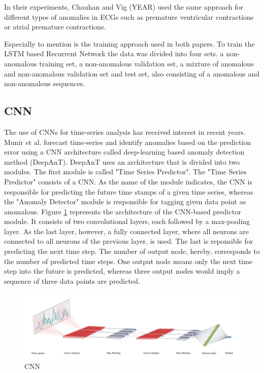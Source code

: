 In their experiments, Chauhan and Vig (YEAR) used the same approach for different types of anomalies in ECGs such as premature ventricular contractions or atrial premature contractions. 

Especially to mention is the training approach used in both papers. To train the  LSTM based Recurrent Network the data was divided into four sets. a non-anomalous training set, a non-anomalous validation set, a mixture of anomalous and non-anomalous validation set and test set, also consisting of a anomalous and non-anomalous sequences. 



\subsection{CNN}

The use of CNNs for time-series analysis has received interest in recent years. Munir et al. forecast time-series and identify anomalies based on the prediction error using a CNN architecture called deep-learning based anomaly detection method (DeepAnT). DeepAnT uses an architecture that is divided into two modules. The first module is called "Time Series Predictor". The "Time Series Predictor" consists of a CNN. As the name of the module indicates, the CNN is responsible for predicting the future time stamps of a given time series, whereas  the "Anomaly Detector" module is responsible for tagging given data point as anomalous. Figure \ref{fig:CNN} represents the architecture of the CNN-based predictor module. It consists of two convolutional layers, each followed by a max-pooling layer. As the last layer, however, a fully connected layer, where all neurons are connected to all neurons of the previous layer, is used. The last is reponsible for predicting the next time step. The number of output node, hereby, corresponds to the number of predicted time steps. One output node means only the next time step into the future is predicted, whereas three output nodes would imply a sequence of three data points are predicted.     


\begin{figure}[h]
	\centering
	\includegraphics[scale=0.4]{Figures/CNN}
	\decoRule
	\caption[CNN]{CNN \parencite{}}
	\label{fig:CNN}
\end{figure}

